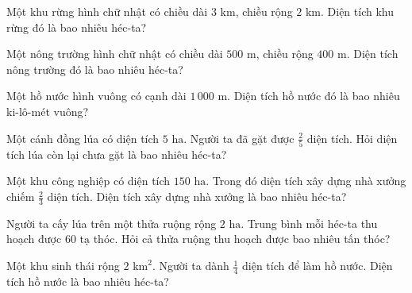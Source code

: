 \begin{ex}
  Một khu rừng hình chữ nhật có chiều dài $3\text{ km}$, chiều rộng $2\text{ km}$. Diện tích khu rừng đó là bao nhiêu héc-ta?
\end{ex}

\begin{ex}
  Một nông trường hình chữ nhật có chiều dài $500\text{ m}$, chiều rộng $400\text{ m}$. Diện tích nông trường đó là bao nhiêu héc-ta?
\end{ex}

\begin{ex}
  Một hồ nước hình vuông có cạnh dài $1\,000\text{ m}$. Diện tích hồ nước đó là bao nhiêu ki-lô-mét vuông?
\end{ex}

\begin{ex}
  Một cánh đồng lúa có diện tích $5\text{ ha}$. Người ta đã gặt được $\frac{2}{5}$ diện tích. Hỏi diện tích lúa còn lại chưa gặt là bao nhiêu héc-ta?
\end{ex}

\begin{ex}
  Một khu công nghiệp có diện tích $150\text{ ha}$. Trong đó diện tích xây dựng nhà xưởng chiếm $\frac{2}{3}$ diện tích. Diện tích xây dựng nhà xưởng là bao nhiêu héc-ta?
\end{ex}

\begin{ex}
  Người ta cấy lúa trên một thửa ruộng rộng $2\text{ ha}$. Trung bình mỗi héc-ta thu hoạch được $60\text{ tạ}$ thóc. Hỏi cả thửa ruộng thu hoạch được bao nhiêu tấn thóc?
\end{ex}

\begin{ex}
  Một khu sinh thái rộng $2\text{ km}^2$. Người ta dành $\frac{1}{4}$ diện tích để làm hồ nước. Diện tích hồ nước là bao nhiêu héc-ta?
\end{ex}

